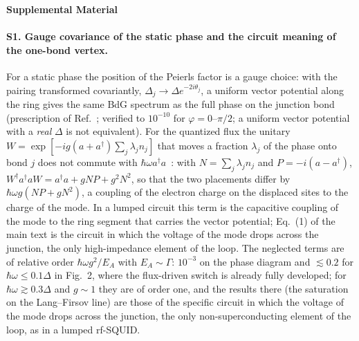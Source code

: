 \onecolumngrid
\begin{center}
{\large\bf Supplemental Material}
\end{center}
\setcounter{figure}{0}
\renewcommand{\thefigure}{S\arabic{figure}}
\renewcommand{\theHfigure}{S\arabic{figure}}
\setcounter{equation}{0}
\renewcommand{\theequation}{S\arabic{equation}}
\renewcommand{\theHequation}{S\arabic{equation}}
\twocolumngrid

\paragraph*{S1. Gauge covariance of the static phase and the circuit meaning of the one-bond vertex.}
For a static phase the position of the Peierls factor is a gauge choice: with the pairing transformed
covariantly, $\Delta_j\to\Delta e^{-2i\theta_j}$, a uniform vector potential along the ring gives the same
BdG spectrum as the full phase on the junction bond (prescription of Ref.~\cite{Dmytruk2021}; verified
to $10^{-10}$ for $\varphi=0$--$\pi/2$; a uniform
vector potential with a \emph{real} $\Delta$ is not equivalent). For the quantized flux the unitary
$W=\exp[-ig(a+a^\dagger)\sum_j\lambda_jn_j]$ that moves a fraction $\lambda_j$ of the phase onto bond $j$
does not commute with $\hbar\omega a^\dagger a$~\cite{DmytrukTrifSimon2016}: with $N=\sum_j\lambda_jn_j$
and $P=-i(a-a^\dagger)$, $W^\dagger a^\dagger aW=a^\dagger a+gNP+g^2N^2$, so that the two placements differ
by $\hbar\omega g(NP+gN^2)$, a coupling of the electron charge on the displaced sites to the charge of the
mode. In a lumped circuit this term is the capacitive coupling of the mode to the ring segment that carries
the vector potential; Eq.~(1) of the main text is the circuit in which the voltage of the mode drops across
the junction, the only high-impedance element of the loop. The neglected terms are of relative order
$\hbar\omega g^2/E_A$ with $E_A\sim\Gamma$: $10^{-3}$ on the phase diagram and $\lesssim0.2$ for
$\hbar\omega\le0.1\Delta$ in Fig.~2, where the flux-driven switch is already fully developed; for
$\hbar\omega\gtrsim0.3\Delta$ and $g\sim1$ they are of order one, and the results there (the saturation on the
Lang--Firsov line) are those of the specific circuit in which the voltage of the mode drops across the
junction, the only non-superconducting element of the loop, as in a lumped rf-SQUID.

